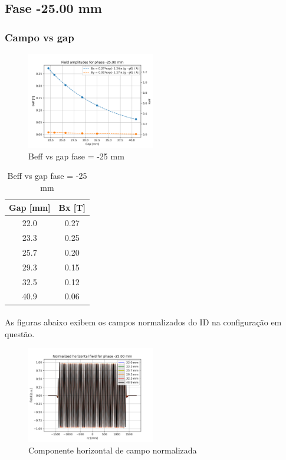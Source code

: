 \documentclass[a4paper,12pt]{article}
\begin{document}
\subsection{Fase -25.00 mm}

\subsubsection{Campo vs gap}

\begin{figure}[H]
\hspace{4cm}
\includegraphics[width=0.5\textwidth]{figs/phase-25 B vs gap.png}
\caption{Beff vs gap fase = -25 mm}
\label{fig:fieldgap-25}
\end{figure}

\begin{table}[H]
\caption{Beff vs gap fase = -25 mm}
\centering
\begin{tabular}{|c|c|}
\hline
   Gap [mm] &   Bx [T] \\
\hline
       22.0   &     0.27      \\
       23.3 &     0.25      \\
       25.7 &     0.20       \\
       29.3 &     0.15      \\
       32.5 &     0.12          \\
       40.9 &     0.06          \\
\hline
\end{tabular}
\end{table}

\paragraph{} As figuras abaixo exibem os campos normalizados do ID na configuração em questão.

\begin{figure}[H]
\begin{center}
\includegraphics[width=0.5\textwidth]{figs/phase-25 Bx.png}
\caption{Componente horizontal de campo normalizada}
\label{fig:bx-25}
\end{center}
\end{figure}
\end{document}
